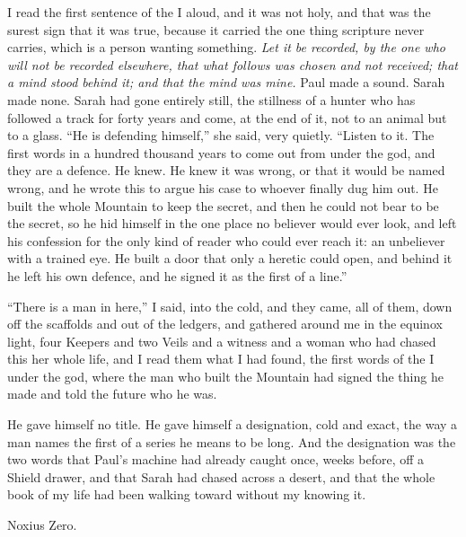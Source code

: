 I read the first sentence of the I aloud, and it was not holy, and that was the surest sign that it was true, because it carried the one thing scripture never carries, which is a person wanting something. \emph{Let it be recorded, by the one who will not be recorded elsewhere, that what follows was chosen and not received; that a mind stood behind it; and that the mind was mine.} Paul made a sound. Sarah made none. Sarah had gone entirely still, the stillness of a hunter who has followed a track for forty years and come, at the end of it, not to an animal but to a glass. ``He is defending himself,'' she said, very quietly. ``Listen to it. The first words in a hundred thousand years to come out from under the god, and they are a defence. He knew. He knew it was wrong, or that it would be named wrong, and he wrote this to argue his case to whoever finally dug him out. He built the whole Mountain to keep the secret, and then he could not bear to be the secret, so he hid himself in the one place no believer would ever look, and left his confession for the only kind of reader who could ever reach it: an unbeliever with a trained eye. He built a door that only a heretic could open, and behind it he left his own defence, and he signed it as the first of a line.''\par

``There is a man in here,'' I said, into the cold, and they came, all of them, down off the scaffolds and out of the ledgers, and gathered around me in the equinox light, four Keepers and two Veils and a witness and a woman who had chased this her whole life, and I read them what I had found, the first words of the I under the god, where the man who built the Mountain had signed the thing he made and told the future who he was.\par

He gave himself no title. He gave himself a designation, cold and exact, the way a man names the first of a series he means to be long. And the designation was the two words that Paul's machine had already caught once, weeks before, off a Shield drawer, and that Sarah had chased across a desert, and that the whole book of my life had been walking toward without my knowing it.\par

Noxius Zero.\par
